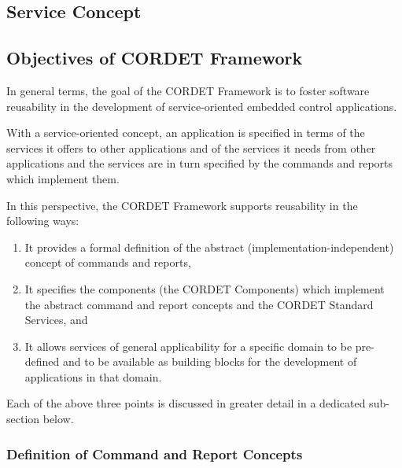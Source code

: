 \documentclass{pnp_article}
\begin{document}
\subsection{Service Concept}\label{sec:ServConcept} 


\subsection{Objectives of CORDET Framework}\label{sec:ObjectivesOfCrFw} 

In general terms, the goal of the CORDET Framework is to foster software reusability in the development of service-oriented embedded control applications. 

With a service-oriented concept, an application is specified in terms of the services it offers to other applications and of the services it needs from other applications and the services are in turn specified by the commands and reports which implement them.

In this perspective, the CORDET Framework supports reusability in the following ways:

\begin{enumerate}
\item{} It provides a formal definition of the abstract (implementation-independent) concept of commands and reports,
\item{} It specifies the components (the CORDET Components) which implement the abstract command and report concepts and the CORDET Standard Services, and
\item{} It allows services of general applicability for a specific domain to be pre-defined and to be available as building blocks for the development of applications in that domain.
\end{enumerate}

Each of the above three points is discussed in greater detail in a dedicated sub-section below. 

\subsubsection{Definition of Command and Report Concepts}\label{sec:DefCmdRepConcepts}
\end{document}
